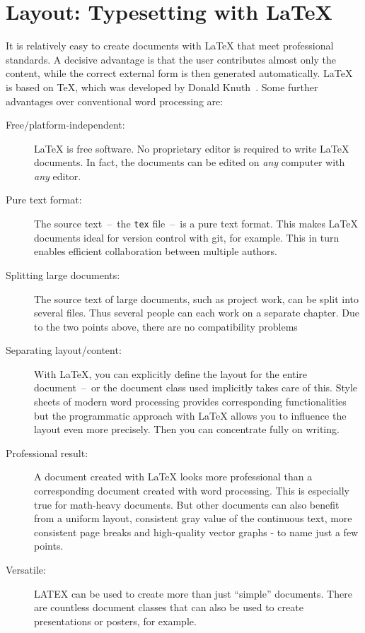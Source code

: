 \chapter{Layout: Typesetting with \LaTeX}
\label{chap:Textsatz}
It is relatively easy to create documents with \LaTeX{} that meet professional 
standards. A decisive advantage is that the user contributes almost only the 
content, while the correct external form is then generated automatically.
\LaTeX{} is based on \TeX, which was developed by
Donald Knuth~\cite{knuth:tex}. Some further advantages over conventional word 
processing are:
\begin{description}
	\item[Free/platform-independent:] \LaTeX{} is free software. No proprietary 
	editor is required to write \LaTeX{} documents. In fact, the documents can 
	be edited on \emph{any} computer with \emph{any} editor.
	\item[Pure text format:] The source text~--~the \texttt{tex} file~--~is a 
	pure text format. This makes \LaTeX{} documents ideal for version control 
	with git, for example. This in turn enables efficient collaboration between 
	multiple authors.
	\item[Splitting large documents:] The source text of large documents, such 
	as project work, can be split into several files. Thus several people can 
	each work on a separate chapter. Due to the two points above, there are no 
	compatibility problems
	\item[Separating layout/content:] With \LaTeX{}, you can explicitly define 
	the layout for the entire document~--~or the document class used implicitly 
	takes care of this. Style sheets of modern word processing provides 
	corresponding functionalities but the programmatic approach with \LaTeX{} 
	allows you to influence the layout even more precisely. Then you can 
	concentrate fully on writing.
	\item[Professional result:] A document created with \LaTeX{} looks more 
	professional than a corresponding document created with word processing. 
	This is especially true for math-heavy documents. But other documents can 
	also benefit from a uniform layout, consistent gray value of the continuous 
	text, more consistent page breaks and high-quality vector graphs - to name 
	just a few points.
	\item[Versatile:] LATEX can be used to create more than just 
	\enquote{simple} documents. There are countless document classes that can 
	also be used to create presentations or posters, for example.
\end{description}

